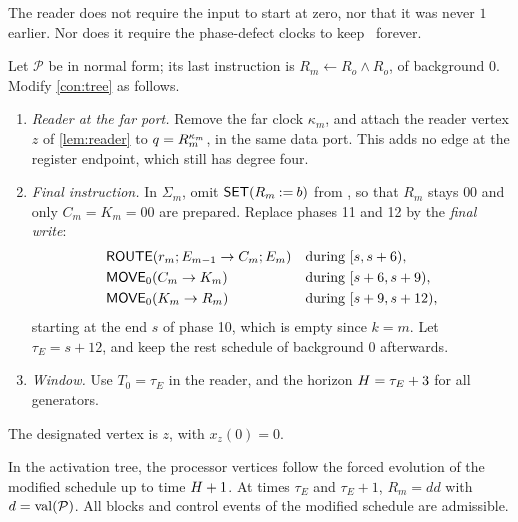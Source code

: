 The reader does not require the input to start at zero, nor that it was never $1$ earlier. Nor does
it require the phase-defect clocks to keep \HOLD\ forever.

\begin{construction}\label{con:ever}
Let $\mathcal P$ be in normal form; its last instruction is $R_m\leftarrow R_o\wedge R_o$, of
background $0$. Modify \cref{con:tree} as follows.
\begin{enumerate}[label=(\arabic*)]
\item \emph{Reader at the far port.} Remove the far clock $\kappa_m$, and attach the reader vertex $z$
  of \cref{lem:reader} to $q=R_m^{\kappa_m}$, in the same data port. This adds no edge at the
  register endpoint, which still has degree four.
\item \emph{Final instruction.} In $\Sigma_m$, omit $\textsf{SET}(R_m\mathbin{:=}b)$ from
  , so that $R_m$ stays $00$ and only $C_m=K_m=00$ are prepared. Replace phases 11
  and 12 by the \emph{final write}:
  \begin{align*}
  &\textsf{ROUTE}(r_m;E_{m-1}\to C_m;E_m) &&\text{during }[s,s+6),\\
  &\textsf{MOVE}_0(C_m\to K_m) &&\text{during }[s+6,s+9),\\
  &\textsf{MOVE}_0(K_m\to R_m) &&\text{during }[s+9,s+12),
  \end{align*}
  starting at the end $s$ of phase 10, which is empty since $k=m$. Let $\tau_E=s+12$, and keep the
  rest schedule of background $0$ afterwards.
\item \emph{Window.} Use $T_0=\tau_E$ in the reader, and the horizon $H=\tau_E+3$ for all
  generators.
\end{enumerate}
The designated vertex is $z$, with $x_z(0)=0$.
\end{construction}

\begin{lemma}\label{lem:finalwrite}
In the activation tree, the processor vertices follow the forced evolution of the modified schedule
up to time $H+1$. At times $\tau_E$ and $\tau_E+1$, $R_m=dd$ with $d=\operatorname{val}(\mathcal P)$. All blocks
and control events of the modified schedule are admissible.
\end{lemma}

